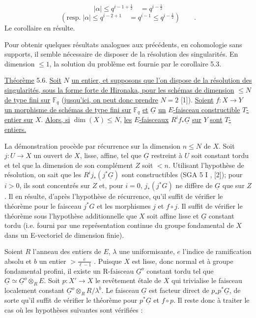\begin{equation*}
|\alpha| \leq q^{i-1+\frac{1}{2}} \quad = q^{i-\frac{1}{2}}
\end{equation*}
\begin{equation*}
(\mathrm{resp.} \; |\alpha| \leq q^{i-2+1} \quad = q^{i-1} \leq q^{i-\frac{1}{2}}) \qquad .
\end{equation*}
Le corollaire en résulte.



Pour obtenir quelques résultats analogues aux précédents, en cohomologie sans supports, il semble nécessaire de disposer de la résolution des singularités. En dimension $\leq 1$, la solution du problème est fournie par le corollaire 5.3.

\underline{Théorème} 5.6. \underline{Soit} $N$ \underline{un entier, et supposons que l'on dispose de la résolution des singularités, sous la forme forte de Hironaka, pour les schémas de dimension} $\leq N$ \underline{de type fini sur} $\mathbb{F}_q$ (\underline{jusqu'ici, on peut donc prendre} $N = 2$ [1]). \underline{Soient} $f : X \longrightarrow Y$ \underline{un morphisme de schémas de type fini sur} $\mathbb{F}_q$ \underline{et} $\underline{G}$ \underline{un} $E$\underline{-faisceau constructible} $T$\underline{-entier sur} $X$. \underline{Alors, si} $\dim(X) \leq N$, \underline{les} $E$\underline{-faisceaux} $R^i f_*\underline{G}$ \underline{sur} $Y$ \underline{sont} $T$\underline{-entiers.}

La démonstration procède par récurrence sur la dimension $n \leq N$ de $X$. Soit $j : U \longrightarrow X$ un ouvert de $X$, lisse, affine, tel que $\underline{G}$ restreint à $U$ soit constant tordu et tel que la dimension de son complément $Z$ soit $< n$. Utilisant l'hypothèse de résolution, on sait que les $R^i j_*(j^*\underline{G})$ sont constructibles (SGA 5 I \quad , [2]); pour $i > 0$, ils sont concentrés sur $Z$ et, pour $i = 0$, $j_*(j^*G)$ ne diffère de $\underline{G}$ que sur $Z$. Il en résulte, d'après l'hypothèse de récurrence, qu'il suffit de vérifier le théorème pour le faisceau $j^*G$ et les morphismes $j$ et $f\circ j$. Il suffit de vérifier le théorème sous l'hypothèse additionnelle que $X$ soit affine lisse et $\underline{G}$ constant tordu (i.e. fourni par une représentation continue du groupe fondamental de $X$ dans un E-vectoriel de dimension finie).



Soient $R$ l'anneau des entiers de $E$, $\lambda$ une uniformisante, $e$ l'indice de ramification absolu et $b$ un entier $> \frac{e}{\ell-1}$ . Puisque $X$ est lisse, donc normal et à groupe fondamental profini, il existe un R-faisceau $\underline{G}^o$ constant tordu tel que $\underline{G} \simeq \underline{G}^o \otimes_R E$. Soit $p : X' \longrightarrow X$ le revêtement étale de $X$ qui trivialise le faisceau localement constant $\underline{G}^o \otimes_R R/\lambda^b$. Le faisceau $\underline{G}$ est facteur direct de $p_*p^*\underline{G}$, de sorte qu'il suffit de vérifier le théorème pour $p^*\underline{G}$ et $f \circ p$. Il reste donc à traiter le cas où les hypothèses suivantes sont vérifiées :

